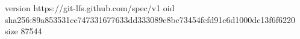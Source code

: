 version https://git-lfs.github.com/spec/v1
oid sha256:89a853531ce747331677633dd333089e8bc73454fefd91c6d1000dc13f6f6220
size 87544
